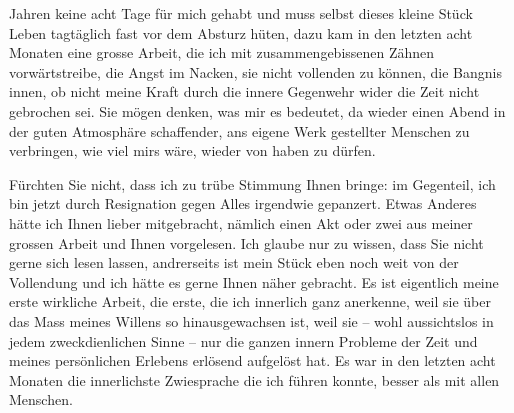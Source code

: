                Jahren keine acht Tage für mich gehabt und muss selbst dieses kleine Stück Leben
               tagtäglich fast vor dem Absturz hüten, dazu kam in den letzten acht Monaten eine
               grosse Arbeit, die ich mit
               zusammengebissenen Zähnen vorwärts{\pb}treibe, die Angst im Nacken, sie nicht vollenden zu können, die Bangnis innen, ob
               nicht meine Kraft durch die innere Gegenwehr wider die Zeit nicht gebrochen sei. Sie
               mögen denken, was mir es bedeutet, da wieder einen Abend in der guten Atmosphäre
               schaffender, ans eigene Werk gestellter Menschen zu verbringen, wie viel mirs wäre,
               wieder von \label{K_L03659-2v}\label{K_L03659-2} haben zu dürfen.\pend
           
\pstart
           Fürchten Sie nicht, dass ich zu trübe Stimmung Ihnen bringe: im Gegenteil, ich bin
               jetzt durch Resignation gegen Alles irgendwie gepanzert. Etwas Anderes hätte ich
               Ihnen lieber mitgebracht, nämlich einen Akt oder zwei aus meiner grossen Arbeit und Ihnen vorgelesen.
               Ich glaube nur zu wissen, dass Sie nicht gerne sich lesen lassen, andrerseits ist
               mein Stück eben noch weit von
               der Vollendung und ich hätte es {\pb}gerne
               Ihnen näher gebracht. Es ist eigentlich meine erste wirkliche Arbeit, die erste, die
               ich innerlich ganz anerkenne, weil sie über das Mass meines Willens so
               hinausgewachsen ist, weil sie – wohl aussichtslos in jedem zweckdienlichen Sinne –
               nur die ganzen innern Probleme der Zeit und meines persönlichen Erlebens erlösend
               aufgelöst hat. Es war in den letzten acht Monaten die innerlichste Zwiesprache die
               ich führen konnte, besser als mit allen Menschen.\pend
           
